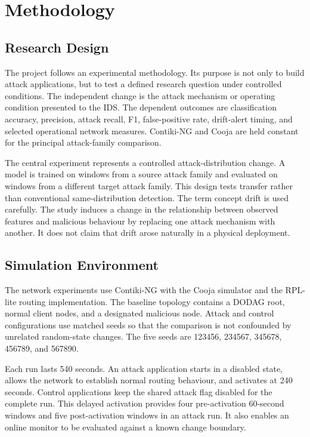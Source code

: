 \chapter{Methodology}
\label{chap:methodology}

\section{Research Design}

The project follows an experimental methodology. Its purpose is not only to build attack applications, but to test a defined research question under controlled conditions. The independent change is the attack mechanism or operating condition presented to the IDS. The dependent outcomes are classification accuracy, precision, attack recall, F1, false-positive rate, drift-alert timing, and selected operational network measures. Contiki-NG and Cooja are held constant for the principal attack-family comparison.

The central experiment represents a controlled attack-distribution change. A model is trained on windows from a source attack family and evaluated on windows from a different target attack family. This design tests transfer rather than conventional same-distribution detection. The term concept drift is used carefully. The study induces a change in the relationship between observed features and malicious behaviour by replacing one attack mechanism with another. It does not claim that drift arose naturally in a physical deployment.

\section{Simulation Environment}

The network experiments use Contiki-NG with the Cooja simulator and the RPL-lite routing implementation. The baseline topology contains a DODAG root, normal client nodes, and a designated malicious node. Attack and control configurations use matched seeds so that the comparison is not confounded by unrelated random-state changes. The five seeds are 123456, 234567, 345678, 456789, and 567890.

Each run lasts 540 seconds. An attack application starts in a disabled state, allows the network to establish normal routing behaviour, and activates at 240 seconds. Control applications keep the shared attack flag disabled for the complete run. This delayed activation provides four pre-activation 60-second windows and five post-activation windows in an attack run. It also enables an online monitor to be evaluated against a known change boundary.

